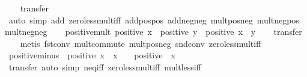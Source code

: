 \begin{isabellebody}
%
\isadelimproof
\ \ %
\endisadelimproof
%
\isatagproof
{}\isamarkupfalse%
\ transfer\isanewline
\ \ \ \ \ \isamarkupfalse%
\ {\isacharparenleft}{\kern0pt}auto\ simp\ add{\isacharcolon}{\kern0pt}\ zero{\isacharunderscore}{\kern0pt}less{\isacharunderscore}{\kern0pt}mult{\isacharunderscore}{\kern0pt}iff\ add{\isacharunderscore}{\kern0pt}pos{\isacharunderscore}{\kern0pt}pos\ add{\isacharunderscore}{\kern0pt}neg{\isacharunderscore}{\kern0pt}neg\ mult{\isacharunderscore}{\kern0pt}pos{\isacharunderscore}{\kern0pt}neg\ mult{\isacharunderscore}{\kern0pt}neg{\isacharunderscore}{\kern0pt}pos\ mult{\isacharunderscore}{\kern0pt}neg{\isacharunderscore}{\kern0pt}neg{\isacharparenright}{\kern0pt}\isanewline
\ \ \isamarkupfalse%
%
\endisatagproof
{\isafoldproof}%
%
\isadelimproof
\isanewline
%
\endisadelimproof
\isanewline
{}\isamarkupfalse%
\ positive{\isacharunderscore}{\kern0pt}mult{\isacharcolon}{\kern0pt}\ {\isachardoublequoteopen}positive\ x\ {\isasymLongrightarrow}\ positive\ y\ {\isasymLongrightarrow}\ positive\ {\isacharparenleft}{\kern0pt}x\ {\isacharasterisk}{\kern0pt}\ y{\isacharparenright}{\kern0pt}{\isachardoublequoteclose}\isanewline
%
\isadelimproof
\ \ %
\endisadelimproof
%
\isatagproof
{}\isamarkupfalse%
\ transfer\isanewline
\ \ \isamarkupfalse%
\ {\isacharparenleft}{\kern0pt}metis\ fst{\isacharunderscore}{\kern0pt}conv\ mult{\isachardot}{\kern0pt}commute\ mult{\isacharunderscore}{\kern0pt}pos{\isacharunderscore}{\kern0pt}neg{}\ snd{\isacharunderscore}{\kern0pt}conv\ zero{\isacharunderscore}{\kern0pt}less{\isacharunderscore}{\kern0pt}mult{\isacharunderscore}{\kern0pt}iff{\isacharparenright}{\kern0pt}%
\endisatagproof
{\isafoldproof}%
%
\isadelimproof
\isanewline
%
\endisadelimproof
\isanewline
{}\isamarkupfalse%
\ positive{\isacharunderscore}{\kern0pt}minus{\isacharcolon}{\kern0pt}\ {\isachardoublequoteopen}{\isasymnot}\ positive\ x\ {\isasymLongrightarrow}\ x\ {\isasymnoteq}\ {}\ {\isasymLongrightarrow}\ positive\ {\isacharparenleft}{\kern0pt}{\isacharminus}{\kern0pt}\ x{\isacharparenright}{\kern0pt}{\isachardoublequoteclose}\isanewline
%
\isadelimproof
\ \ %
\endisadelimproof
%
\isatagproof
{}\isamarkupfalse%
\ transfer\ {\isacharparenleft}{\kern0pt}auto\ simp{\isacharcolon}{\kern0pt}\ neq{\isacharunderscore}{\kern0pt}iff\ zero{\isacharunderscore}{\kern0pt}less{\isacharunderscore}{\kern0pt}mult{\isacharunderscore}{\kern0pt}iff\ mult{\isacharunderscore}{\kern0pt}less{\isacharunderscore}{\kern0pt}{}{\isacharunderscore}{\kern0pt}iff{\isacharparenright}{\kern0pt}%

\end{isabellebody}

